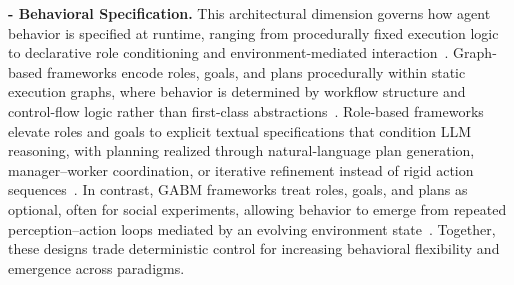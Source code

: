 

\smallskip
\noindent\textbf{- Behavioral Specification.}
This architectural dimension governs how agent behavior is specified at runtime, ranging from procedurally fixed execution logic to declarative role conditioning and environment-mediated interaction~\cite{castelfranchi1998modelling,sang2025beyond}. Graph-based frameworks encode roles, goals, and plans procedurally within static execution graphs, where behavior is determined by workflow structure and control-flow logic rather than first-class abstractions~\cite{langgraph2025,langflow2025,autogpt2025,n8n2025}. Role-based frameworks elevate roles and goals to explicit textual specifications that condition LLM reasoning, with planning realized through natural-language plan generation, manager--worker coordination, or iterative refinement instead of rigid action sequences~\cite{crewai2025,wu2024autogen,openaiagents2025,OpenAgents}. In contrast, GABM frameworks treat roles, goals, and plans as optional, often for social experiments, allowing behavior to emerge from repeated perception--action loops mediated by an evolving environment state~\cite{vezhnevets2023generative}. Together, these designs trade deterministic control for increasing behavioral flexibility and emergence across paradigms.
